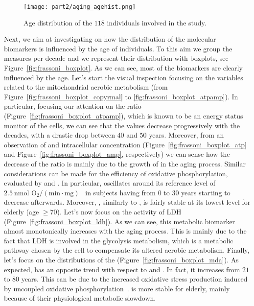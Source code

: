 \begin{figure}[]
	\centering
	\texttt{[image: part2/aging\_agehist.png]}
	\caption{Age distribution of the $118$ individuals involved in the study.} \label{fig:frassoni_agehist}
\end{figure}

Next, we aim at investigating on how the distribution of the molecular biomarkers is influenced by the age of individuals. To this aim we group the measures per decade and we represent their distribution with boxplots, see Figure~\ref{fig:frassoni_boxplot}.
As we can see, most of the biomarkers are clearly influenced by the age.
Let's start the visual inspection focusing on the variables related to the mitochondrial aerobic metabolism (from Figure~\ref{fig:frassoni_boxplot_copyrmal} to \ref{fig:frassoni_boxplot_atpamp}).
In particular, focusing our attention on the \atpamp ratio (Figure~\ref{fig:frassoni_boxplot_atpamp}), which is known to be an energy status monitor of the cells, we can see that the values decrease progressively with the decades, with a drastic drop between $40$ and $50$ years. Moreover, from an observation of \atp and \amp intracellular concentration (Figure~\ref{fig:frassoni_boxplot_atp} and Figure~\ref{fig:frassoni_boxplot_amp}, respectively) we can sense how the decrease of the \atpamp ratio is mainly due to the growth of \amp in the aging process.
Similar considerations can be made for the efficiency of oxidative phosphorylation, evaluated by \popyrmal and \posucc. In particular, \popyrmal oscillates around its reference level of $2.5~\text{nmol~O}_2/(\text{min}\cdot\text{mg})$~\cite{hinkle2005p} in subjects having from $0$ to $30$ years starting to decrease afterwards. Moreover, \popyrmal, similarly to \atpamp, is fairly stable at its lowest level for elderly (age $\geq 70$).
Let's now focus on the activity of LDH (Figure~\ref{fig:frassoni_boxplot_ldh}). As we can see, this metabolic biomarker almost monotonically increases with the aging process.
This is mainly due to the fact that LDH is involved in the glycolysis metabolism, which is a metabolic pathway chosen by the cell to compensate its altered aerobic metabolism.
Finally, let's focus on the distributions of the \mda (Figure~\ref{fig:frassoni_boxplot_mda}). As expected, \mda has an opposite trend with respect to \atpamp and \popyrmal. In fact, it increases from $21$ to $80$ years. This can be due to the increased oxidative stress production induced by uncoupled oxidative phosphorylation~\cite{dai2014mitochondrial}.
\mda is more stable for elderly, mainly because of their physiological metabolic slowdown.

